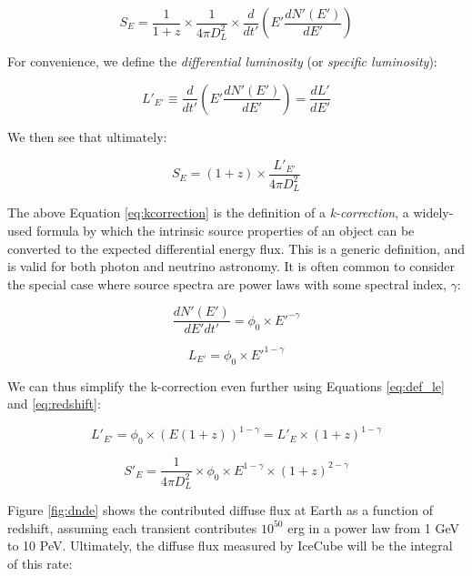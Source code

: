 \begin{equation}
S_{E} = \frac{1}{1+z} \times \frac{1}{4 \pi D_{L}^{2}} \times \frac{d}{dt'} \left( E' \frac{dN'(E')}{dE'} \right)
\end{equation}

For convenience, we define the \emph{differential luminosity} (or \emph{specific luminosity}):

\begin{equation}
L'_{E'} \equiv \frac{d}{dt'} \left( E' \frac{dN'(E')}{dE'} \right) = \frac{dL'}{dE'}
\end{equation}

We then see that ultimately:

\begin{equation}
S_{E} = (1+z) \times \frac{L'_{E'}}{4 \pi D_{L}^{2}}
\label{eq:kcorrection}
\end{equation}

The above Equation \ref{eq:kcorrection} is the definition of a \emph{k-correction}, a widely-used formula by which the intrinsic source properties of an object can be converted to the expected differential energy flux. This is a generic definition, and is valid for both photon and neutrino astronomy. It is often common to consider the special case where source spectra are power laws with some spectral index, $\gamma$:

\begin{equation}
\frac{dN'(E')}{dE'dt'} = \phi_{0} \times E'^{-\gamma}
\label{eq:def_pl}
\end{equation}

\begin{equation}
L_{E'} = \phi_{0} \times E'^{1-\gamma}
\label{eq:def_le}
\end{equation}

We can thus simplify the k-correction even further using Equations \ref{eq:def_le} and \ref{eq:redshift}:

\begin{equation}
L'_{E'} = \phi_{0} \times  (E(1+z))^{1-\gamma} = L'_{E} \times (1+z)^{1-\gamma}
\end{equation}

\begin{equation}
S'_{E} = \frac{1}{4 \pi D_{L}^{2}} \times \phi_{0} \times E^{1 - \gamma} \times (1+z) ^{2-\gamma}
\end{equation}

Figure \ref{fig:dnde} shows the contributed diffuse flux at Earth as a function of redshift, assuming each transient contributes $10^{50}$ erg in a power law from 1 GeV to 10 PeV. Ultimately, the diffuse flux measured by IceCube will be the integral of this rate: 

